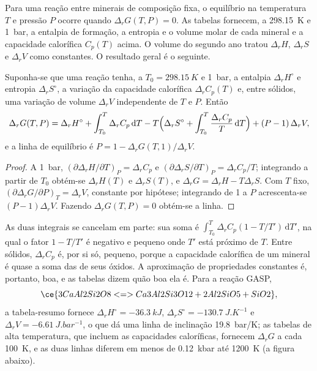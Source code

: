 Para uma reação entre minerais de composição fixa, o equilíbrio na
temperatura $T$ e pressão $P$ ocorre quando $\Delta_rG(T, P) = 0$. As tabelas fornecem, a
\qty{298.15}{K} e \qty{1}{bar}, a entalpia de formação, a entropia e
o volume molar de cada mineral e a capacidade calorífica $C_p(T)$ acima. O
volume do segundo ano tratou $\Delta_rH$, $\Delta_rS$ e $\Delta_rV$ como constantes. O
resultado geral é o seguinte.

\begin{theorem}\label{thm:b3:petrological-thermodynamics:dg}
Suponha-se que uma reação tenha, a $T_0 = \qty{298.15}{K}$ e \qty{1}{bar}, a
entalpia $\Delta_rH^\circ$ e entropia $\Delta_rS^\circ$, a
variação da capacidade calorífica $\Delta_rC_p(T)$ e, entre sólidos, uma variação de volume $\Delta_rV$
independente de $T$ e $P$. Então
\[
  \Delta_rG(T, P) = \Delta_rH^\circ + \int_{T_0}^{T}\Delta_rC_p\,\mathrm dT
  - T\Bigl(\Delta_rS^\circ + \int_{T_0}^{T}\frac{\Delta_rC_p}{T}\,\mathrm dT\Bigr)
  + (P - 1)\,\Delta_rV ,
\]
e a linha de equilíbrio é $P = 1 - \Delta_rG(T, 1)/\Delta_rV$.
\end{theorem}

\begin{proof}
A \qty{1}{bar}, $(\partial\Delta_rH/\partial T)_P = \Delta_rC_p$ e
$(\partial\Delta_rS/\partial T)_P = \Delta_rC_p/T$; integrando a partir de $T_0$
obtém-se $\Delta_rH(T)$ e $\Delta_rS(T)$, e $\Delta_rG = \Delta_rH -
T\Delta_rS$. Com $T$ fixo, $(\partial\Delta_rG/\partial P)_T = \Delta_rV$,
constante por hipótese; integrando de 1 a $P$ acrescenta-se $(P - 1)\Delta_rV$.
Fazendo $\Delta_rG(T, P) = 0$ obtém-se a linha.
\end{proof}

As duas integrais se cancelam em parte: sua soma é $\int_{T_0}^T\Delta_rC_p(1 -
T/T')\,\mathrm dT'$, na qual o fator $1 - T/T'$ é negativo e pequeno
onde $T'$ está próximo de $T$. Entre sólidos, $\Delta_rC_p$ é, por si só, pequeno,
porque a capacidade calorífica de um mineral é quase a soma das de seus
óxidos. A aproximação de propriedades constantes é, portanto, boa, e as
tabelas dizem quão boa ela é. Para a reação GASP,
\[
  \ce{3 CaAl2Si2O8 <=> Ca3Al2Si3O12 + 2 Al2SiO5 + SiO2},
\]
a tabela-resumo fornece $\Delta_rH^\circ = \qty{-36.3}{kJ}$,
$\Delta_rS^\circ = \qty{-130.7}{J.K^{-1}}$ e $\Delta_rV =
\qty{-6.61}{J.bar^{-1}}$, o que dá uma linha de inclinação \qty{19.8}{bar/K}; as
tabelas de alta temperatura, que incluem as capacidades caloríficas, fornecem
$\Delta_rG$ a cada \qty{100}{K}, e as duas linhas diferem em menos de
\qty{0.12}{kbar} até \qty{1200}{K} (a figura abaixo).

